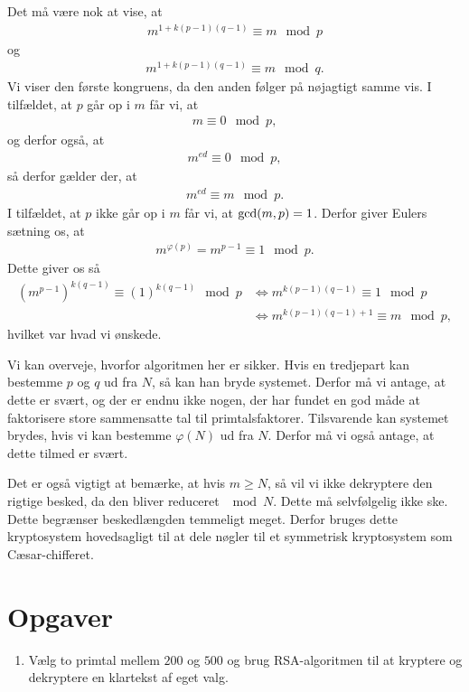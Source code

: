 \documentclass[12pt]{article}
\begin{document}
Det må være nok at vise, at 
\begin{align*}
m^{1+k(p-1)(q-1)} \equiv m \mod{p}
\end{align*}
og 
\begin{align*}
m^{1+k(p-1)(q-1)} \equiv m \mod{q}.
\end{align*}
Vi viser den første kongruens, da den anden følger på nøjagtigt samme vis. I tilfældet, at $p$ går op i $m$ får vi, at 
\begin{align*}
m \equiv 0 \mod{p},
\end{align*}
og derfor også, at 
\begin{align*}
m^{ed} \equiv 0 \mod{p},
\end{align*}
så derfor gælder der, at 
\begin{align*}
m^{ed} \equiv m \mod{p}.
\end{align*}
I tilfældet, at $p$ ikke går op i $m$ får vi, at $\textnormal{gcd}(m,p)=1$. Derfor giver Eulers sætning os, at 
\begin{align*}
m^{\varphi(p)} = m^{p-1} \equiv 1 \mod{p}.
\end{align*}
Dette giver os så
\begin{align*}
(m^{p-1})^{k(q-1)} \equiv (1)^{k(q-1)} \mod{p} &\Leftrightarrow m^{k(p-1)(q-1)} \equiv 1 \mod{p}\\
&\Leftrightarrow m^{k(p-1)(q-1)+1} \equiv m \mod{p},
\end{align*}
hvilket var hvad vi ønskede. 

Vi kan overveje, hvorfor algoritmen her er sikker. Hvis en tredjepart kan bestemme $p$ og $q$ ud fra $N$, så kan han bryde systemet. Derfor må vi antage, at dette er svært, og der er endnu ikke nogen, der har fundet en god måde at faktorisere store sammensatte tal til primtalsfaktorer. Tilsvarende kan systemet brydes, hvis vi kan bestemme $\varphi(N)$ ud fra $N$. Derfor må vi også antage, at dette tilmed er svært. 

Det er også vigtigt at bemærke, at hvis $m\geq N$, så vil vi ikke dekryptere den rigtige besked, da den bliver reduceret $\mod{N}$. Dette må selvfølgelig ikke ske. Dette begrænser beskedlængden temmeligt meget. Derfor bruges dette kryptosystem hovedsagligt til at dele nøgler til et symmetrisk kryptosystem som Cæsar-chifferet.


\section*{Opgaver}

\begin{enumerate}[label=\roman*)]
\item Vælg to primtal mellem $200$ og $500$ og brug RSA-algoritmen til at kryptere og dekryptere en klartekst af eget valg.
\end{enumerate}
\end{document}
